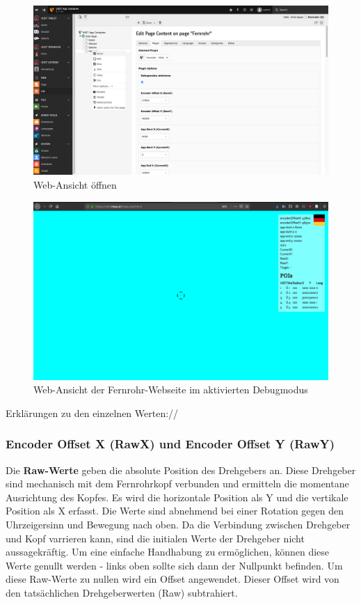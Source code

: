 \begin{figure}[ht!]
\centering
\includegraphics[width=12cm]{Figures/paula/fernrohr/einrichtung_fernrohr/fernrohr_web_ansicht.png}
\caption{Web-Ansicht öffnen}
\label{img:fernrohr_webansicht_oeffnen}
\end{figure}

\begin{figure}[ht!]
\centering
\includegraphics[width=12cm]{Figures/paula/fernrohr/einrichtung_fernrohr/fernrohr_web_ansicht1.png}
\caption{Web-Ansicht der Fernrohr-Webseite im aktivierten Debugmodus}
\label{img:fernrohr_webansicht_debugmodus}
\end{figure}



Erklärungen zu den einzelnen Werten://

\subsubsection{Encoder Offset X (RawX) und Encoder Offset Y (RawY)}

Die \textbf{Raw-Werte} geben die absolute Position des Drehgebers an. Diese Drehgeber sind mechanisch mit dem Fernrohrkopf verbunden und ermitteln die momentane Ausrichtung des Kopfes. Es wird die horizontale Position als Y und die vertikale Position als X erfasst. Die Werte sind abnehmend bei einer Rotation gegen den Uhrzeigersinn und Bewegung nach oben. 
Da die Verbindung zwischen Drehgeber und Kopf varrieren kann, sind die initialen Werte der Drehgeber nicht aussagekräftig. Um eine einfache Handhabung zu ermöglichen, können diese Werte genullt werden - links oben sollte sich dann der Nullpunkt befinden. Um diese Raw-Werte zu nullen wird ein Offset angewendet. Dieser Offset wird von den tatsächlichen Drehgeberwerten (Raw) subtrahiert. 

